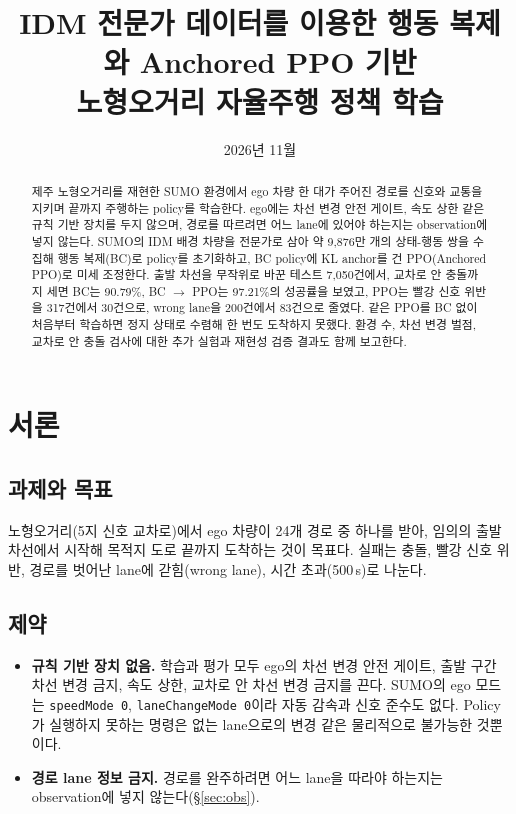 \documentclass[10pt,a4paper]{article}
\title{IDM 전문가 데이터를 이용한 행동 복제와 Anchored PPO 기반\\ 노형오거리 자율주행 정책 학습}
\author{}
\date{2026년 11월}
\begin{document}
\maketitle

\begin{abstract}
제주 노형오거리를 재현한 SUMO 환경에서 ego 차량 한 대가 주어진 경로를 신호와 교통을 지키며 끝까지 주행하는 policy를 학습한다.
ego에는 차선 변경 안전 게이트, 속도 상한 같은 규칙 기반 장치를 두지 않으며, 경로를 따르려면 어느 lane에 있어야 하는지는 observation에 넣지 않는다.
SUMO의 IDM 배경 차량을 전문가로 삼아 약 9,876만 개의 상태-행동 쌍을 수집해 행동 복제(BC)로 policy를 초기화하고, BC policy에 KL anchor를 건 PPO(Anchored PPO)로 미세 조정한다.
출발 차선을 무작위로 바꾼 테스트 7,050건에서, 교차로 안 충돌까지 세면 BC는 90.79\%, BC $\rightarrow$ PPO는 97.21\%의 성공률을 보였고, PPO는 빨강 신호 위반을 317건에서 30건으로, wrong lane을 200건에서 83건으로 줄였다.
같은 PPO를 BC 없이 처음부터 학습하면 정지 상태로 수렴해 한 번도 도착하지 못했다.
환경 수, 차선 변경 벌점, 교차로 안 충돌 검사에 대한 추가 실험과 재현성 검증 결과도 함께 보고한다.
\end{abstract}

\section{서론}

\subsection{과제와 목표}
노형오거리(5지 신호 교차로)에서 ego 차량이 24개 경로 중 하나를 받아, 임의의 출발 차선에서 시작해 목적지 도로 끝까지 도착하는 것이 목표다.
실패는 충돌, 빨강 신호 위반, 경로를 벗어난 lane에 갇힘(wrong lane), 시간 초과(500\,s)로 나눈다.

\subsection{제약}
\begin{itemize}
  \item \textbf{규칙 기반 장치 없음.} 학습과 평가 모두 ego의 차선 변경 안전 게이트, 출발 구간 차선 변경 금지, 속도 상한, 교차로 안 차선 변경 금지를 끈다. SUMO의 ego 모드는 \texttt{speedMode 0}, \texttt{laneChangeMode 0}이라 자동 감속과 신호 준수도 없다. Policy가 실행하지 못하는 명령은 없는 lane으로의 변경 같은 물리적으로 불가능한 것뿐이다.
  \item \textbf{경로 lane 정보 금지.} 경로를 완주하려면 어느 lane을 따라야 하는지는 observation에 넣지 않는다(\S\ref{sec:obs}).
\end{itemize}
\end{document}
